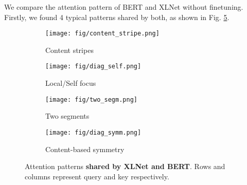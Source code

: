 \documentclass{article}
\begin{document}
We compare the attention pattern of BERT and XLNet without finetuning. Firstly, we found 4 typical patterns shared by both, as shown in Fig. \ref{fig:shared_attn}.
\begin{figure}[!h]
  \vspace{-1em}
  \centering
  \begin{subfigure}[b]{0.22\textwidth}
    \centering
    \texttt{[image: fig/content\_stripe.png]}
    \caption{\footnotesize Content stripes}
    \label{fig:content_stripe}
    \vspace{-0.3em}
  \end{subfigure}
  \hfill
  \begin{subfigure}[b]{0.235\textwidth}
    \centering
    \texttt{[image: fig/diag\_self.png]}
    \caption{\footnotesize Local/Self focus}
    \label{fig:diag_self}
    \vspace{-0.3em}
  \end{subfigure}
  \hfill
  \begin{subfigure}[b]{0.22\textwidth}
    \centering
    \texttt{[image: fig/two\_segm.png]}
    \caption{\footnotesize Two segments}
    \label{fig:two_segm}
    \vspace{-0.3em}
  \end{subfigure}
  \hfill
  \begin{subfigure}[b]{0.23\textwidth}
    \centering
    \texttt{[image: fig/diag\_symm.png]}
    \caption{\footnotesize Content-based symmetry}
    \label{fig:diag_symm}
    \vspace{-0.3em}
  \end{subfigure}
  \caption{\footnotesize Attention patterns \textbf{shared by XLNet and BERT}. Rows and columns represent query and key respectively.}
  \label{fig:shared_attn}
  \vspace{-1.5em}
\end{figure}
\end{document}
